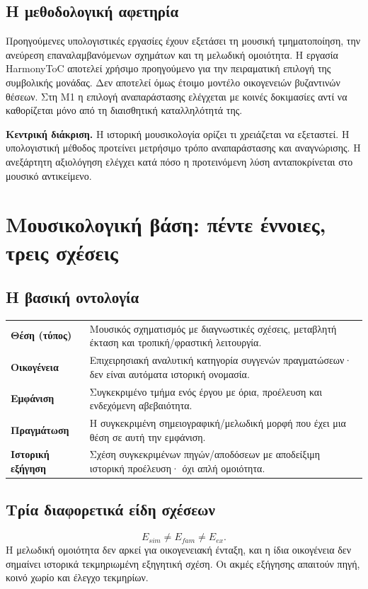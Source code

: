 \documentclass[11pt,a4paper]{extarticle}
\begin{document}
\subsection*{Η μεθοδολογική αφετηρία}
Προηγούμενες υπολογιστικές εργασίες έχουν εξετάσει τη μουσική τμηματοποίηση, την ανεύρεση επαναλαμβανόμενων σχημάτων και τη μελωδική ομοιότητα. Η εργασία HarmonyToC αποτελεί χρήσιμο προηγούμενο για την πειραματική επιλογή της συμβολικής μονάδας. Δεν αποτελεί όμως έτοιμο μοντέλο οικογενειών βυζαντινών θέσεων. Στη M1 η επιλογή αναπαράστασης ελέγχεται με κοινές δοκιμασίες αντί να καθορίζεται μόνο από τη διαισθητική καταλληλότητά της.

\begin{keybox}
\textbf{Κεντρική διάκριση.} Η ιστορική μουσικολογία ορίζει τι χρειάζεται να εξεταστεί. Η υπολογιστική μέθοδος προτείνει μετρήσιμο τρόπο αναπαράστασης και αναγνώρισης. Η ανεξάρτητη αξιολόγηση ελέγχει κατά πόσο η προτεινόμενη λύση ανταποκρίνεται στο μουσικό αντικείμενο.
\end{keybox}


\section{Μουσικολογική βάση: πέντε έννοιες, τρεις σχέσεις}
\subsection*{Η βασική οντολογία}
\begin{tabularx}{\linewidth}{>{\bfseries}p{3cm}X}
Θέση (τύπος) & Μουσικός σχηματισμός με διαγνωστικές σχέσεις, μεταβλητή έκταση και τροπική/φραστική λειτουργία.\tabularnewline
Οικογένεια & Επιχειρησιακή αναλυτική κατηγορία συγγενών πραγματώσεων· δεν είναι αυτόματα ιστορική ονομασία.\tabularnewline
Εμφάνιση & Συγκεκριμένο τμήμα ενός έργου με όρια, προέλευση και ενδεχόμενη αβεβαιότητα.\tabularnewline
Πραγμάτωση & Η συγκεκριμένη σημειογραφική/μελωδική μορφή που έχει μια θέση σε αυτή την εμφάνιση.\tabularnewline
Ιστορική εξήγηση & Σχέση συγκεκριμένων πηγών/αποδόσεων με αποδείξιμη ιστορική προέλευση· όχι απλή ομοιότητα.\tabularnewline
\end{tabularx}

\subsection*{Τρία διαφορετικά είδη σχέσεων}
\[E_{sim}\neq E_{fam}\neq E_{ex}.\]
Η μελωδική ομοιότητα δεν αρκεί για οικογενειακή ένταξη, και η ίδια οικογένεια δεν σημαίνει ιστορικά τεκμηριωμένη εξηγητική σχέση. Οι ακμές εξήγησης απαιτούν πηγή, κοινό χωρίο και έλεγχο τεκμηρίων.
\end{document}
